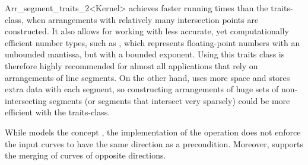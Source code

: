 \begin{ccRefClass}{Arr_segment_traits_2<Kernel>}
\ccRefName{} achieves faster running times than the
 traits-class, when
arrangements with relatively many intersection points are constructed.
It also allows for working with less accurate, yet computationally
efficient number types, such as , which
represents floating-point numbers with an unbounded mantissa, but with
a bounded exponent. Using this traits class is therefore highly recommended
for almost all applications that rely on arrangements of line segments.
On the other hand, \ccRefName{} uses more space and stores extra data with
each segment, so constructing arrangements of huge sets of non-intersecting
segments (or segments that intersect very sparsely) could be more efficient
with the  traits-class.

While \ccRefName{} models the concept
, the implementation of
the  operation does not enforce the input curves
to have the same direction as a precondition. Moreover, \ccRefName{}
supports the merging of curves of opposite directions.

 
\ccIsModel
    \\
    \\

\end{ccRefClass}

\ccRefPageEnd
